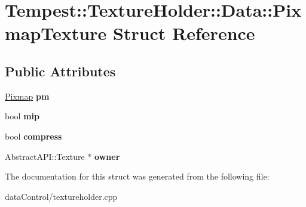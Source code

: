 \hypertarget{struct_texture_holder_1_1_data_1_1_pixmap_texture}{\section{Tempest\+:\+:Texture\+Holder\+:\+:Data\+:\+:Pixmap\+Texture Struct Reference}
\label{struct_texture_holder_1_1_data_1_1_pixmap_texture}
}
\subsection*{Public Attributes}
\begin{DoxyCompactItemize}
\item 
\hypertarget{struct_texture_holder_1_1_data_1_1_pixmap_texture_a99f88b257f1ca608b894f7cfac1e98a2}{\hyperlink{class_tempest_1_1_pixmap}{Pixmap} {\bfseries pm}}\label{struct_texture_holder_1_1_data_1_1_pixmap_texture_a99f88b257f1ca608b894f7cfac1e98a2}

\item 
\hypertarget{struct_texture_holder_1_1_data_1_1_pixmap_texture_a7e1705f39eda31ff0924a86235b8ec05}{bool {\bfseries mip}}\label{struct_texture_holder_1_1_data_1_1_pixmap_texture_a7e1705f39eda31ff0924a86235b8ec05}

\item 
\hypertarget{struct_texture_holder_1_1_data_1_1_pixmap_texture_a2494729685f7c541e8e2043af8766e88}{bool {\bfseries compress}}\label{struct_texture_holder_1_1_data_1_1_pixmap_texture_a2494729685f7c541e8e2043af8766e88}

\item 
\hypertarget{struct_texture_holder_1_1_data_1_1_pixmap_texture_a48dffd1a4d400843a37fe6a010e87861}{Abstract\+A\+P\+I\+::\+Texture $\ast$ {\bfseries owner}}\label{struct_texture_holder_1_1_data_1_1_pixmap_texture_a48dffd1a4d400843a37fe6a010e87861}

\end{DoxyCompactItemize}


The documentation for this struct was generated from the following file\+:\begin{DoxyCompactItemize}
\item 
data\+Control/textureholder.\+cpp\end{DoxyCompactItemize}
